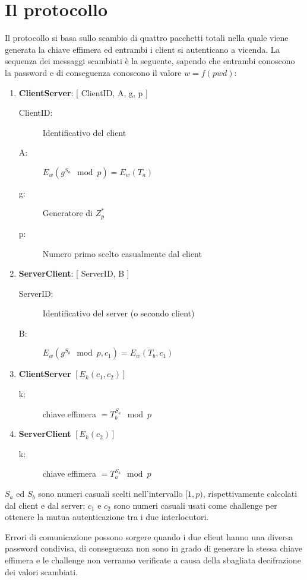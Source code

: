 \documentclass[10pt, letterpaper]{article}
\begin{document}
\section{Il protocollo}
Il protocollo si basa sullo scambio di quattro pacchetti totali nella quale
viene generata la chiave effimera ed entrambi i client si autenticano a vicenda.
La sequenza dei messaggi scambiati è la seguente, sapendo che entrambi conoscono
la password e di conseguenza conoscono il valore $w=f(pwd)$:
\begin{enumerate}
	\item \textbf{Client\textrightarrow Server}: {[} ClientID, A, g, p {]}
		\begin{description}
			\item [ClientID:] Identificativo del client
			\item [A:] $E_w( g^{S_a} \mod p ) = E_w( T_a )$
			\item [g:] Generatore di $Z_p^*$
			\item [p:] Numero primo scelto casualmente dal client
		\end{description}
	\item \textbf{Server\textrightarrow Client}: {[} ServerID, B {]}
		\begin{description}
			\item [ServerID:] Identificativo del server (o secondo client)
			\item [B:] $E_w( g^{S_b} \mod p, c_1 ) = E_w( T_b, c_1 )$
		\end{description}
	\item \textbf{Client\textrightarrow Server} $[E_k( c_1, c_2 )]$
		\begin{description}
			\item [k:] chiave effimera $= T_b^{S_a} \mod p$
		\end{description}
	\item \textbf{Server\textrightarrow Client} $[E_k( c_2 )]$
		\begin{description}
			\item [k:] chiave effimera $= T_a^{S_b} \mod p$
		\end{description}
\end{enumerate}
$S_a$ ed $S_b$ sono numeri casuali scelti nell'intervallo $[1,p)$,
rispettivamente calcolati dal client e dal server; $c_1$ e $c_2$ sono numeri
casuali usati come challenge per ottenere la mutua autenticazione tra i due
interlocutori.

Errori di comunicazione possono sorgere quando i due client hanno una diversa
password condivisa, di conseguenza non sono in grado di generare la stessa
chiave effimera e le challenge non verranno verificate a causa della sbagliata
decifrazione dei valori scambiati.
\end{document}

